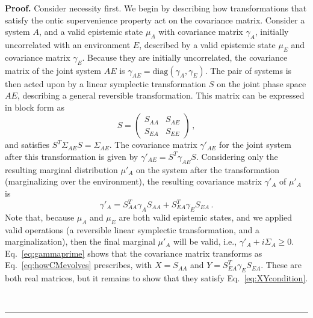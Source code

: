 \documentclass[pra,superscriptaddress,nofootinbib,12pt]{revtex4-2}
\newenvironment{proof}[1][Proof]{\noindent\textbf{#1.} }{\ \rule{0.5em}{0.5em}}
\begin{document}
\begin{proof} Consider necessity first. We begin by describing how transformations that satisfy the ontic supervenience property act on the covariance matrix.  Consider a system $A$, and a valid epistemic state $\mu_{A}$ with covariance matrix $\gamma_{A}$, initially uncorrelated with an environment $E$, described by a valid epistemic state $\mu_E$ and covariance matrix $\gamma_{E}$.  Because they are initially uncorrelated, the covariance matrix of the joint system $AE$ is $\gamma_{AE} = \text{diag}(\gamma_A,\gamma_E)$.  The pair of systems is then acted upon by a linear symplectic transformation $S$ on the joint phase space $AE$, describing a general reversible transformation.  This matrix can be expressed in block form as
\begin{equation}
  S = \begin{pmatrix} S_{AA} & S_{AE} \\ S_{EA} & S_{EE} \end{pmatrix}\,,
\end{equation}
and satisfies $S^T \Sigma_{AE} S = \Sigma_{AE}$.  The covariance matrix $\gamma'_{AE}$ for the joint system after this transformation is given by $\gamma'_{AE} = S^T \gamma_{AE} S$.  Considering only the resulting marginal distribution $\mu'_A$ on the system after the transformation (marginalizing over the environment), the resulting covariance matrix $\gamma'_A$ of $\mu'_A$ is
\begin{equation} \label{eq:gammaprime}
  \gamma'_A = S^T_{AA}\gamma_A S_{AA} + S^T_{EA}\gamma_E S_{EA} \,.
\end{equation}
Note that, because $\mu_A$ and $\mu_E$ are both valid epistemic states, and we applied valid operations (a reversible linear symplectic transformation, and a marginalization), then the final marginal $\mu'_A$ will be valid, i.e., $\gamma'_A+i\Sigma_A \ge 0$.
Eq.~\eqref{eq:gammaprime} shows that the covariance matrix transforms as Eq.~\eqref{eq:howCMevolves} prescribes, with $X = S_{AA}$ and $Y = S^T_{EA}\gamma_E S_{EA}$.  These are both real matrices, but it remains to show that they satisfy Eq.~\eqref{eq:XYcondition}.


\end{proof}
\end{document}
